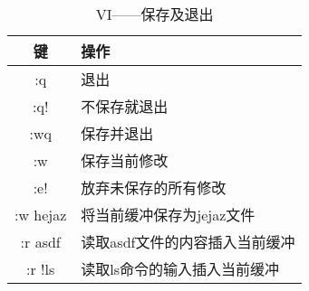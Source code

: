 \begin{table}[htpb]
  \centering
  \begin{tabular}{c|l}
    \hline \hline
    键 & 操作 \\ \hline
    :q & 退出 \\
    :q! & 不保存就退出 \\
    :wq & 保存并退出 \\
    :w & 保存当前修改 \\
    :e! & 放弃未保存的所有修改 \\
    :w hejaz & 将当前缓冲保存为jejaz文件 \\
    :r asdf & 读取asdf文件的内容插入当前缓冲 \\
    :r !ls & 读取ls命令的输入插入当前缓冲 \\
    \hline \hline
  \end{tabular}
  \caption{VI——保存及退出}
  \label{tab:vi-saveAndQuit}
\end{table}
